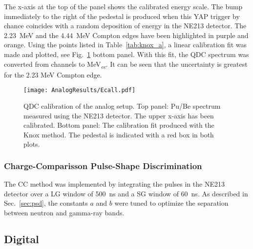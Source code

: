 \documentclass[main.tex]{subfiles}
\begin{document}
The x-axis at the top of the panel shows the calibrated energy scale. The bump immediately to the right of the pedestal is produced when this YAP trigger by chance coincides with a random deposition of energy in the NE213 detector. The \SI{2.23}{MeV} and the \SI{4.44}{MeV} Compton edges have been highlighted in purple and orange. Using the points listed in Table~\ref{tab:knox_a}, a linear calibration fit was made and plotted, see Fig.~\ref{fig:qdc_a} bottom panel. With this fit, the QDC spectrum was converted from channels to \si{MeV_{\textit{ee}}}. It can be seen that the uncertainty is greatest for the 2.23 \si{\MeV} Compton edge.
\begin{figure}[ht!]
    \centering
        \texttt{[image: AnalogResults/Ecall.pdf]}
        \caption[QDC calibration of the analog setup]{QDC calibration of the analog setup. Top panel: Pu/Be spectrum measured using the NE213 detector. The upper x-axis has been calibrated. Bottom panel: The calibration fit produced with the Knox method. The pedestal is indicated with a red box in both plots.}
    \label{fig:qdc_a}
\end{figure}

\subsubsection{Charge-Comparisson Pulse-Shape Discrimination}
The CC method was implemented by integrating the pulses in the NE213 detector over a LG window of \SI{500}{ns} and a SG window of \SI{60}{ns}. As described in Sec.~\ref{sec:psd}, the constants $a$ and $b$ were tuned to optimize the separation between neutron and gamma-ray bands.




\subsection{Digital}
\end{document}
